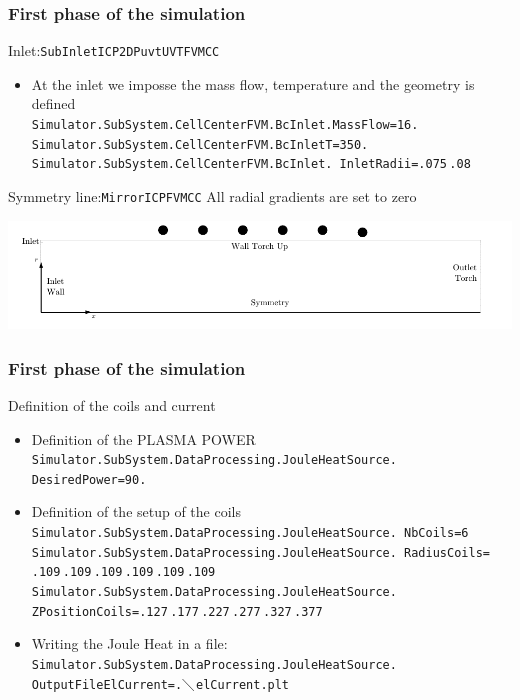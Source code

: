 \documentclass[compress,10pt]{beamer}
\begin{document}
\begin{frame}
\frametitle{First phase of the simulation}
\begin{block}{Inlet:\texttt{SubInletICP2DPuvtUVTFVMCC}}
\begin{itemize}
\item At the inlet we imposse the mass flow, temperature and the geometry is defined\\
\texttt{\small{Simulator.SubSystem.CellCenterFVM.BcInlet.MassFlow=16.}}\\
\texttt{\small{Simulator.SubSystem.CellCenterFVM.BcInletT=350.}}\\
\texttt{\small{Simulator.SubSystem.CellCenterFVM.BcInlet.
\hspace*{6cm}InletRadii=.075$\,$.08}}\\
\end{itemize}
\end{block}
\begin{block}{Symmetry line:\texttt{MirrorICPFVMCC}}
 All radial gradients are set to zero
\end{block}

 \includegraphics[width=\textwidth]{geom_torch.pdf}
\end{frame}

\begin{frame}
\frametitle{First phase of the simulation}
\begin{block}{Definition of the coils and current}
\begin{itemize}
\item Definition of the PLASMA POWER\\
\texttt{\small{Simulator.SubSystem.DataProcessing.JouleHeatSource.
\hspace*{2cm}DesiredPower=90.}}\\
\item Definition of the setup of the coils\\
\texttt{\small{Simulator.SubSystem.DataProcessing.JouleHeatSource.
\hspace*{2cm}NbCoils=6}}
\texttt{\small{Simulator.SubSystem.DataProcessing.JouleHeatSource.
\hspace*{2cm}RadiusCoils=$\,$.109$\,$.109$\,$.109$\,$.109$\,$.109$\,$.109}}
\texttt{\small{Simulator.SubSystem.DataProcessing.JouleHeatSource.
\hspace*{2cm}ZPositionCoils=.127$\,$.177$\,$.227$\,$.277$\,$.327$\,$.377}}
\item Writing the Joule Heat in a file:\\
\texttt{\small{Simulator.SubSystem.DataProcessing.JouleHeatSource.
\hspace*{2cm}OutputFileElCurrent=.$\diagdown$elCurrent.plt}}
\end{itemize}
\end{block}
\end{frame}
\end{document}
